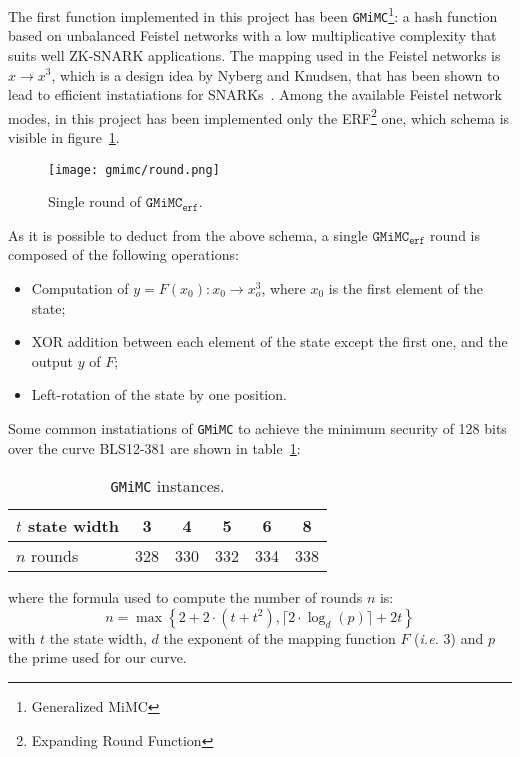 \documentclass[12pt, a4paper]{report}
\begin{document}
The first function implemented in this project has been \texttt{GMiMC}\footnote{Generalized MiMC}: a hash function based on unbalanced Feistel networks with a low multiplicative complexity that suits well ZK-SNARK applications. The mapping used in the Feistel networks is $x \rightarrow x^3$, which is a design idea by Nyberg and Knudsen, that has been shown to lead to efficient instatiations for SNARKs~\cite{mimc}. Among the available Feistel network modes, in this project has been implemented only the ERF\footnote{Expanding Round Function} one, which schema is visible in figure~\ref{fig:gmimc}.

\begin{figure}[H]
  \begin{center}
    \texttt{[image: gmimc/round.png]}
  \end{center}
  \caption{Single round of $\texttt{GMiMC}_\texttt{erf}$.}\label{fig:gmimc}
\end{figure}

As it is possible to deduct from the above schema, a single $\texttt{GMiMC}_\texttt{erf}$ round is composed of the following operations:
\begin{itemize}
  \item Computation of $y = F(x_0): x_0 \rightarrow x_o^3$, where $x_0$ is the first element of the state;
  \item XOR addition between each element of the state except the first one, and the output $y$ of $F$;
  \item Left-rotation of the state by one position.
\end{itemize}

Some common instatiations of \texttt{GMiMC} to achieve the minimum security of 128 bits over the curve BLS12-381 are shown in table~\ref{tab:gmimcinstances}:

\begin{table}[H]
  \begin{center}
    \begin{tabular}{|l|c|c|c|c|c|}
      \hline
      $t$ state width & 3 & 4 & 5 & 6 & 8 \\
      \hline
      $n$ rounds & 328 & 330 & 332 & 334 & 338 \\
      \hline
    \end{tabular}
  \end{center}
  \caption{\texttt{GMiMC} instances.}\label{tab:gmimcinstances}
\end{table}
where the formula used to compute the number of rounds $n$ is:
\begin{equation}
  n = \max \left\{ 2 + 2 \cdot (t + t^2), \lceil 2 \cdot \log_d(p) \rceil + 2t \right\}
  \label{eq:gmimcrounds}
\end{equation}
with $t$ the state width, $d$ the exponent of the mapping function $F$ (\textsl{i.e.} 3) and $p$ the prime used for our curve.
\end{document}
